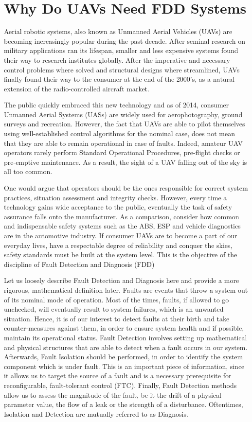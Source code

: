 \chapter{Why Do UAVs Need FDD Systems}

Aerial robotic systems, also known as Unmanned Aerial Vehicles (UAVs) are becoming increasingly popular during the past decade. After seminal research on military applications ran its lifespan, smaller and less expensive systems found their way to research institutes globally. After the imperative and necessary control problems where solved and structural designs where streamlined, UAVs finally found their way to the consumer at the end of the 2000's, as a natural extension of the radio-controlled aircraft market.

The public quickly embraced this new technology and as of 2014, consumer Unmanned Aerial Systems (UASs) are widely used for aerophotography, ground surveys and recreation. However, the fact that UAVs are able to pilot themselves using well-established control algorithms for the nominal case, does not mean that they are able to remain operational in case of faults. Indeed, amateur UAV operators rarely perform Standard Operational Procedures, pre-flight checks or pre-emptive maintenance. As a result, the sight of a UAV falling out of the sky is all too common.

One would argue that operators should be the ones responsible for correct system practices, situation assessment and integrity checks. However, every time a technology gains wide acceptance to the public, eventually the task of safety assurance falls onto the manufacturer. As a comparison, consider how common and indispensable safety systems such as the ABS, ESP and vehicle diagnostics are in the automotive industry. If consumer UAVs are to become a part of our everyday lives, have a respectable degree of reliability and conquer the skies, safety standards must be built at the system level. This is the objective of the discipline of Fault Detection and Diagnosis (FDD)

Let us loosely describe Fault Detection and Diagnosis here and provide a more rigorous, mathematical definition later. Faults are events that throw a system out of its nominal mode of operation. Most of the times, faults, if allowed to go unchecked, will eventually result to system failures, which is an unwanted situation. Hence, it is of our interest to detect faults at their birth and take counter-measures against them, in order to ensure system health and if possible, maintain its operational status. Fault Detection involves setting up mathematical and physical structures that are able to detect when a fault occurs in our system. Afterwards, Fault Isolation should be performed, in order to identify the system component which is under fault. This is an important piece of information, since it allows us to target the source of a fault and is a necessary prerequisite for reconfigurable, fault-tolerant control (FTC). Finally, Fault Detection methods allow us to assess the magnitude of the fault, be it the drift of a physical parameter value, the flow of a leak or the strength of a disturbance. Oftentimes, Isolation and Detection are mutually referred to as Diagnosis.

